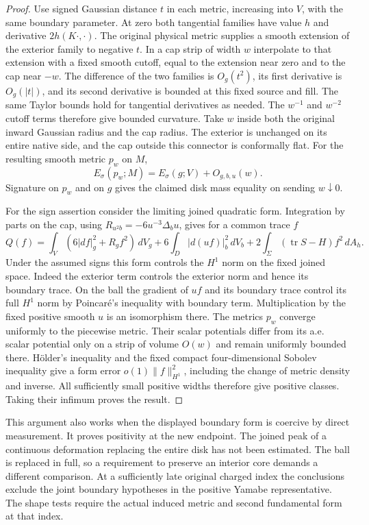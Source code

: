\documentclass[11pt,letterpaper]{article}
\numberwithin{equation}{section}
\DeclareMathOperator{\tr}{tr}
\begin{document}
\begin{proof}
Use signed Gaussian distance \(t\) in each metric, increasing into
\(V\), with the same boundary parameter. At zero both tangential
families have value \(h\) and derivative \(2h(K\cdot,\cdot)\).
The original physical metric supplies a smooth extension of the
exterior family to negative \(t\). In a cap strip of width \(w\)
interpolate to that extension with a fixed smooth cutoff, equal
to the extension near zero and to the cap near \(-w\). The difference
of the two families is \(O_g(t^2)\), its first derivative is
\(O_g(|t|)\), and its second derivative is bounded at this fixed
source and fill. The same Taylor bounds hold for tangential derivatives
as needed. The \(w^{-1}\) and \(w^{-2}\) cutoff terms therefore give
bounded curvature. Take \(w\) inside both the original inward
Gaussian radius and the cap radius. The exterior is unchanged on its
entire native side, and the cap outside this connector is conformally
flat. For the resulting smooth metric \(p_w\) on \(M\),
\[
 E_\sigma(p_w;M)=E_\sigma(g;V)+O_{g,b,u}(w).
\]
Signature on \(p_w\) and on \(g\) gives the claimed disk mass equality
on sending \(w\downarrow0\).

For the sign assertion consider the limiting joined quadratic form.
Integration by parts on the cap, using
\(R_{u^2b}=-6u^{-3}\Delta_b u\), gives for a common trace \(f\)
\[
 Q(f)=\int_V(6|df|_g^2+R_g f^2)\,dV_g+
 6\int_D |d(uf)|_b^2\,dV_b+
 2\int_\Sigma(\tr S-H)f^2\,dA_h .
\]
Under the assumed signs this form controls the \(H^1\) norm on
the fixed joined space. Indeed the exterior term controls the
exterior norm and hence its boundary trace. On the ball the gradient
of \(uf\) and its boundary trace control its full \(H^1\) norm by
Poincar\'e's inequality with boundary term. Multiplication by the
fixed positive smooth \(u\) is an isomorphism there. The metrics
\(p_w\) converge uniformly to the piecewise metric. Their scalar
potentials differ from its a.e. scalar potential only on a strip
of volume \(O(w)\) and remain uniformly bounded there. H\"older's
inequality and the fixed compact four-dimensional Sobolev inequality
give a form error \(o(1)\|f\|_{H^1}^2\), including the change of
metric density and inverse. All sufficiently small positive widths
therefore give positive classes. Taking their infimum proves the result.
\end{proof}

This argument also works when the displayed boundary form is coercive
by direct measurement. It proves positivity at the new endpoint.
The joined peak of a continuous deformation replacing the entire disk
has not been estimated. The ball is replaced in full, so a requirement
to preserve an interior core demands a different comparison. At a
sufficiently late original charged index the conclusions exclude the
joint boundary hypotheses in the positive Yamabe representative.
The shape tests require the actual induced metric and second fundamental
form at that index.
\end{document}
